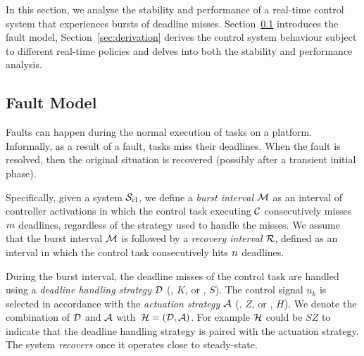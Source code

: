 In this section, we analyse the stability and performance of a real-time control system that experiences bursts of deadline misses. 
Section~\ref{sec:fault} introduces the fault model, Section~\ref{sec:derivation} derives the control system behaviour subject to different real-time policies and delves into both the stability and performance analysis.

\subsection{Fault Model}%
\label{sec:fault}

Faults can happen during the normal execution of tasks on a platform.
Informally, as a result of a fault, tasks miss their deadlines.
When the fault is resolved, then the original situation is recovered (possibly after a transient initial phase).

Specifically, given a system $\mathcal{S}_{\text{cl}}$, we define a \emph{burst interval} $\mathcal{M}$ as an interval of controller activations in which the control task executing $\mathcal{C}$ consecutively misses $m$ deadlines, regardless of the strategy used to handle the misses.
We assume that the burst interval $\mathcal{M}$ is followed by a \emph{recovery interval} $\mathcal{R}$, defined as an interval in which the control task consecutively hits $n$ deadlines.

During the burst interval, the deadline misses of the control task are handled using a \emph{deadline handling strategy} $\mathcal{D}$ (\tK{}, $K$, or \tS{}, $S$).
The control signal $u_k$ is selected in accordance with the \emph{actuation strategy} $\mathcal{A}$ (\tZ{}, $Z$, or \tH{}, $H$).
We denote the combination of $\mathcal{D}$ and $\mathcal{A}$ with~$\mathcal{H} = \left(\mathcal{D},\mathcal{A}\right)$.
For example $\mathcal{H}$ could be $SZ$ to indicate that the \tS{} deadline handling strategy is paired with the \tZ{} actuation strategy.
The system \emph{recovers} once it operates close to steady-state.

